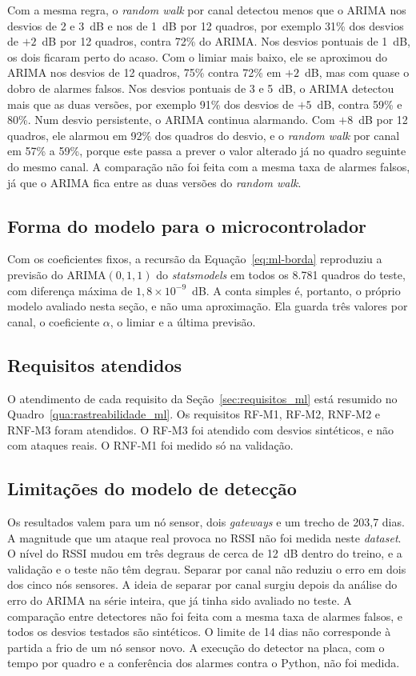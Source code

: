 Com a mesma regra, o \textit{random walk} por canal detectou menos que o ARIMA
nos desvios de 2 e 3~dB e nos de 1~dB por 12 quadros, por exemplo 31\% dos
desvios de $+2$~dB por 12 quadros, contra 72\% do ARIMA. Nos desvios pontuais
de 1~dB, os dois ficaram perto do acaso. Com o limiar mais baixo, ele se aproximou do
ARIMA nos desvios de 12 quadros, 75\% contra 72\% em $+2$~dB, mas com quase o
dobro de alarmes falsos. Nos desvios pontuais de 3 e 5~dB, o ARIMA detectou mais que as duas versões,
por exemplo 91\% dos desvios de $+5$~dB, contra 59\% e 80\%. Num desvio
persistente, o ARIMA continua alarmando. Com $+8$~dB por 12 quadros, ele alarmou
em 92\% dos quadros do desvio, e o \textit{random walk} por canal em 57\% a
59\%, porque este passa a prever o valor alterado já no quadro seguinte do
mesmo canal. A comparação não foi feita com a mesma taxa de alarmes falsos, já
que o ARIMA fica entre as duas versões do \textit{random walk}.

\subsection{Forma do modelo para o microcontrolador}
\label{subsec:ml-res-borda}

Com os coeficientes fixos, a recursão da Equação~\ref{eq:ml-borda} reproduziu a
previsão do ARIMA$(0,1,1)$ do \textit{statsmodels} em todos os 8.781 quadros do
teste, com diferença máxima de $1{,}8 \times 10^{-9}$~dB. A conta simples é,
portanto, o próprio modelo avaliado nesta seção, e não uma aproximação. Ela
guarda três valores por canal, o coeficiente $\alpha$, o limiar e a última
previsão.

\subsection{Requisitos atendidos}
\label{subsec:ml-res-requisitos}

O atendimento de cada requisito da Seção~\ref{sec:requisitos_ml} está resumido
no Quadro~\ref{qua:rastreabilidade_ml}. Os requisitos RF-M1, RF-M2, RNF-M2 e
RNF-M3 foram atendidos. O RF-M3 foi atendido com desvios sintéticos, e não com
ataques reais. O RNF-M1 foi medido só na validação.

\subsection{Limitações do modelo de detecção}
\label{subsec:ml-res-limitacoes}

Os resultados valem para um nó sensor, dois \textit{gateways} e um trecho de
203,7 dias. A magnitude que um ataque real provoca no RSSI não foi medida neste
\textit{dataset}. O nível do RSSI mudou em três degraus de cerca de 12~dB
dentro do treino, e a validação e o teste não têm degrau. Separar por canal não
reduziu o erro em dois dos cinco nós sensores. A ideia de separar por canal
surgiu depois da análise do erro do ARIMA na série inteira, que já tinha sido
avaliado no teste. A comparação entre detectores não foi feita com a mesma taxa
de alarmes falsos, e todos os desvios testados são sintéticos. O limite de 14
dias não corresponde à partida a frio de um nó sensor novo. A execução do
detector na placa, com o tempo por quadro e a conferência dos alarmes contra o
Python, não foi medida.
